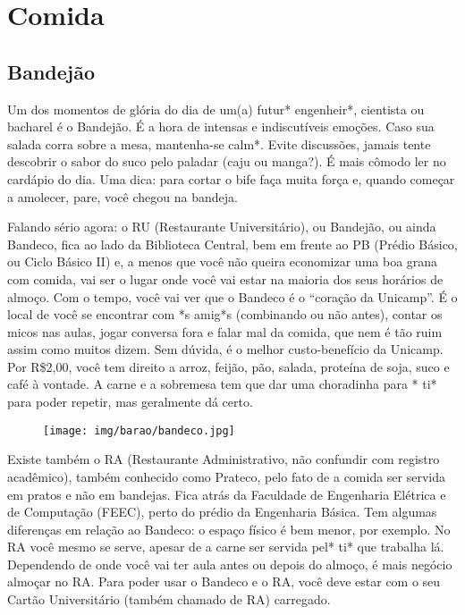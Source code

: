 
\section{Comida}
\subsection{Bandejão}

Um dos momentos de glória do dia de um(a) futur* engenheir*, cientista ou
bacharel é o Bandejão. É a hora de intensas e indiscutíveis emoções. Caso sua
salada corra sobre a mesa, mantenha-se calm*. Evite discussões, jamais tente
descobrir o sabor do suco pelo paladar (caju ou manga?). É mais cômodo ler no
cardápio do dia. Uma dica: para cortar o bife faça muita força e, quando começar
a amolecer, pare, você chegou na bandeja.

Falando sério agora: o RU (Restaurante Universitário), ou Bandejão, ou ainda
Bandeco, fica ao lado da Biblioteca Central, bem em frente ao PB (Prédio Básico,
ou Ciclo Básico II) e, a menos que você não queira economizar uma boa grana com
comida, vai ser o lugar onde você vai estar na maioria dos seus horários de
almoço. Com o tempo, você vai ver que o Bandeco é o ``coração da Unicamp''. É o
local de você se encontrar com *s amig*s (combinando ou não antes), contar os
micos nas aulas, jogar conversa fora e falar mal da comida, que nem é tão ruim
assim como muitos dizem. Sem dúvida, é o melhor custo-benefício da Unicamp. Por
R\$2,00, você tem direito a arroz, feijão, pão, salada, proteína de soja, suco e
café à vontade. A carne e a sobremesa tem que dar uma choradinha para * ti*
para poder repetir, mas geralmente dá certo.

\begin{figure}[h!]
    \centering
    \texttt{[image: img/barao/bandeco.jpg]}
\end{figure}

Existe também o RA (Restaurante Administrativo, não confundir com registro
acadêmico), também conhecido como Prateco, pelo fato de a comida ser servida em
pratos e não em bandejas. Fica atrás da Faculdade de Engenharia Elétrica e de
Computação (FEEC), perto do prédio da Engenharia Básica. Tem algumas diferenças
em relação ao Bandeco: o espaço físico é bem menor, por exemplo. No RA você
mesmo se serve, apesar de a carne ser servida pel* ti* que trabalha
lá. Dependendo de onde você vai ter aula antes ou depois do almoço, é mais
negócio almoçar no RA. Para poder usar o Bandeco e o RA, você deve estar com o
seu Cartão Universitário (também chamado de RA) carregado.

